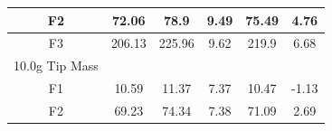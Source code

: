 \documentclass[11pt]{article}
\begin{document}
\begin{table}[H]
\begin{tabular}{|c|c|c|c|c|c|}
F2                                             & 72.06                                                                                                                    & 78.9                                                                  & \cellcolor[HTML]{FFFC9E}9.49                                                                  & 75.49                                                                    &\cellcolor[HTML]{FFFC9E} 4.76                                                                  \\ \hline
F3                                             & 206.13                                                                                                                   & 225.96                                                                & \cellcolor[HTML]{FFFC9E}9.62                                                                  & 219.9                                                                    & \cellcolor[HTML]{FFFC9E}6.68                                                                  \\ \hline
\rowcolor[HTML]{C0C0C0} 
10.0g Tip Mass                    &                                                                                                                          &                                                                       &                                                                       &                                                                          &                                                                       \\ \hline
F1                                             & 10.59                                                                                                                    & 11.37                                                                 & \cellcolor[HTML]{FFFC9E}7.37                                                                  & 10.47                                                                    & \cellcolor[HTML]{FFFC9E}-1.13                                                                 \\ \hline
F2                                             & 69.23                                                                                                                    & 74.34                                                                 & \cellcolor[HTML]{FFFC9E}7.38                                                                  & 71.09                                                                    &\cellcolor[HTML]{FFFC9E} 2.69                                                                  \\ \hline

\end{tabular}
\end{table}
\end{document}
